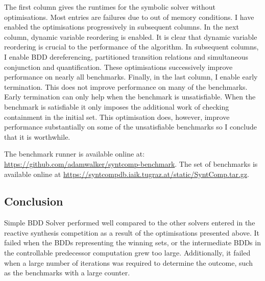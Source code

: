 The first column gives the runtimes for the symbolic solver without optimisations. Most entries are failures due to out of memory conditions. I have enabled the optimisations progressively in subsequent columns. In the next column, dynamic variable reordering is enabled. It is clear that dynamic variable reordering is crucial to the performance of the algorithm. In subsequent columns, I enable BDD dereferencing, partitioned transition relations and simultaneous conjunction and quantification. These optimisations successively improve performance on nearly all benchmarks. Finally, in the last column, I enable early termination. This does not improve performance on many of the benchmarks. Early termination can only help when the benchmark is unsatisfiable. When the benchmark is satisfiable it only imposes the additional work of checking containment in the initial set. This optimisation does, however, improve performance substantially on some of the unsatisfiable benchmarks so I conclude that it is worthwhile.

The benchmark runner is available online at: \url{https://github.com/adamwalker/syntcomp-benchmark}. The set of benchmarks is available online at \url{https://syntcompdb.iaik.tugraz.at/static/SyntComp.tar.gz}.

\subsection{Conclusion}
Simple BDD Solver performed well compared to the other solvers entered in the reactive synthesis competition as a result of the optimisations presented above. It failed when the BDDs representing the winning sets, or the intermediate BDDs in the controllable predecessor computation grew too large. Additionally, it failed when a large number of iterations was required to determine the outcome, such as the benchmarks with a large counter. 

